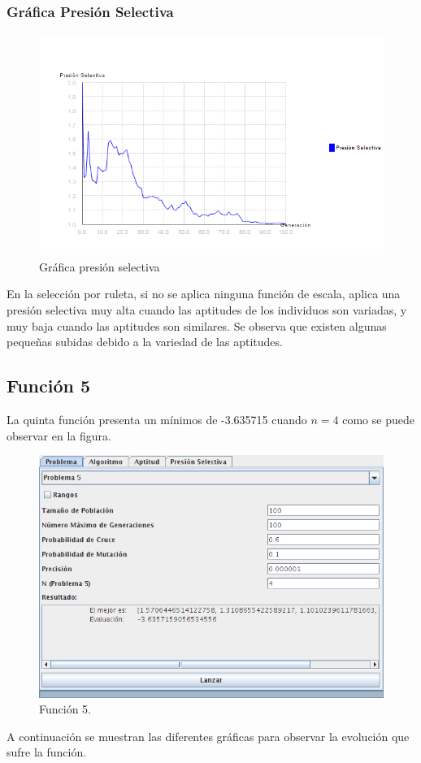 \documentclass[12pt]{article}
\begin{document}
\subsubsection*{Gráfica Presión Selectiva}
\begin{figure}[H]
\centering
\includegraphics[scale=0.4]{graficas/F4inicial_presion}
\caption{Gráfica presión selectiva}
\label{fig}
\end{figure}
	En la selección por ruleta, si no se aplica ninguna función de escala, aplica una presión selectiva muy alta cuando las aptitudes de los individuos son variadas, y muy baja cuando las aptitudes son similares. Se observa que existen algunas pequeñas subidas debido a la variedad de las aptitudes.
\newpage

\subsection{Función 5}
	La quinta función presenta un mínimos de -3.635715 cuando $n=4$ como se puede observar en la figura.
\begin{figure}[H]
\centering
\includegraphics[scale=0.4]{graficas/F5inicial}
\caption{Función 5.}
\label{fig}
\end{figure}
	A continuación se muestran las diferentes gráficas para observar la evolución que sufre la función.
\end{document}
